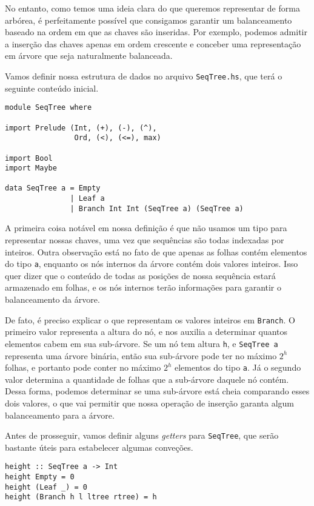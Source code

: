 \documentclass[a4paper]{article}
\begin{document}
No entanto, como temos uma ideia clara do que queremos representar de forma arbórea, é perfeitamente possível que consigamos garantir um balanceamento baseado na ordem em que as chaves são inseridas.
Por exemplo, podemos admitir a inserção das chaves apenas em ordem crescente e conceber uma representação em árvore que seja naturalmente balanceada.

Vamos definir nossa estrutura de dados no arquivo \texttt{SeqTree.hs}, que terá o seguinte conteúdo inicial.

\begin{verbatim}
module SeqTree where

import Prelude (Int, (+), (-), (^),
                Ord, (<), (<=), max)

import Bool
import Maybe

data SeqTree a = Empty
               | Leaf a
               | Branch Int Int (SeqTree a) (SeqTree a)
\end{verbatim}

A primeira coisa notável em nossa definição é que não usamos um tipo para representar nossas chaves, uma vez que sequências são todas indexadas por inteiros.
Outra observação está no fato de que apenas as folhas contém elementos do tipo \texttt{a}, enquanto os nós internos da árvore contém dois valores inteiros.
Isso quer dizer que o conteúdo de todas as posições de nossa sequência estará armazenado em folhas, e os nós internos terão informações para garantir o balanceamento da árvore.

De fato, é preciso explicar o que representam os valores inteiros em \texttt{Branch}.
O primeiro valor representa a altura do nó, e nos auxilia a determinar quantos elementos cabem em sua sub-árvore.
Se um nó tem altura \texttt{h}, e \texttt{SeqTree a} representa uma árvore binária, então sua sub-árvore pode ter no máximo $2^h$ folhas, e portanto pode conter no máximo $2^h$ elementos do tipo \texttt{a}.
Já o segundo valor determina a quantidade de folhas que a sub-árvore daquele nó contém.
Dessa forma, podemos determinar se uma sub-árvore está cheia comparando esses dois valores, o que vai permitir que nossa operação de inserção garanta algum balanceamento para a árvore.

Antes de prosseguir, vamos definir alguns \emph{getters} para \texttt{SeqTree}, que serão bastante úteis para estabelecer algumas conveções.

\begin{verbatim}
height :: SeqTree a -> Int
height Empty = 0
height (Leaf _) = 0
height (Branch h l ltree rtree) = h
\end{verbatim}
\end{document}
